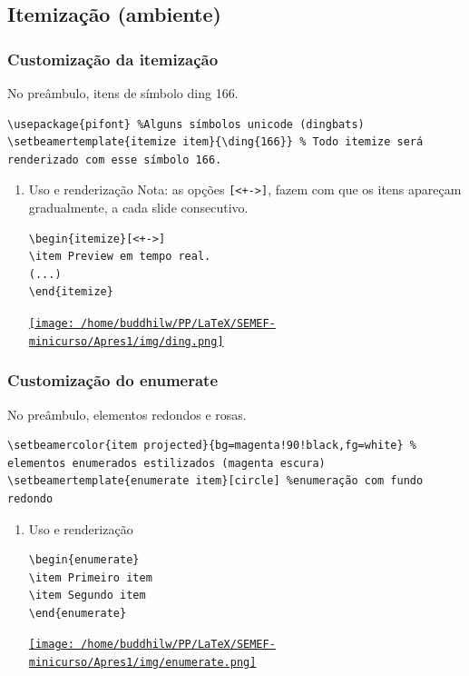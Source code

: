 \documentclass[11pt]{article}
\begin{document}
\subsection{Itemização (ambiente)}
\label{sec:orge4e1c2f}
\subsubsection{Customização da itemização}
\label{sec:org06450fe}
No preâmbulo, itens de símbolo ding 166.
\begin{verbatim}
\usepackage{pifont} %Alguns símbolos unicode (dingbats)
\setbeamertemplate{itemize item}{\ding{166}} % Todo itemize será renderizado com esse símbolo 166.
\end{verbatim}
\begin{enumerate}
\item Uso e renderização
\label{sec:org1b9c90d}
Nota: as opções \texttt{[<+->]}, fazem com que os itens apareçam
gradualmente, a cada slide consecutivo.

\begin{verbatim}
\begin{itemize}[<+->]
\item Preview em tempo real.
(...)
\end{itemize}
\end{verbatim}

\href{img/ding.png}{\texttt{[image: /home/buddhilw/PP/LaTeX/SEMEF-minicurso/Apres1/img/ding.png]}}
\end{enumerate}

\subsubsection{Customização do enumerate}
\label{sec:org5eeeb37}
No preâmbulo, elementos redondos e rosas.
\begin{verbatim}
\setbeamercolor{item projected}{bg=magenta!90!black,fg=white} % elementos enumerados estilizados (magenta escura)
\setbeamertemplate{enumerate item}[circle] %enumeração com fundo redondo
\end{verbatim}

\begin{enumerate}
\item Uso e renderização
\label{sec:orga05a210}
\begin{verbatim}
\begin{enumerate}
\item Primeiro item
\item Segundo item
\end{enumerate}
\end{verbatim}

\href{img/enumerate.png}{\texttt{[image: /home/buddhilw/PP/LaTeX/SEMEF-minicurso/Apres1/img/enumerate.png]}}
\end{enumerate}
\end{document}
